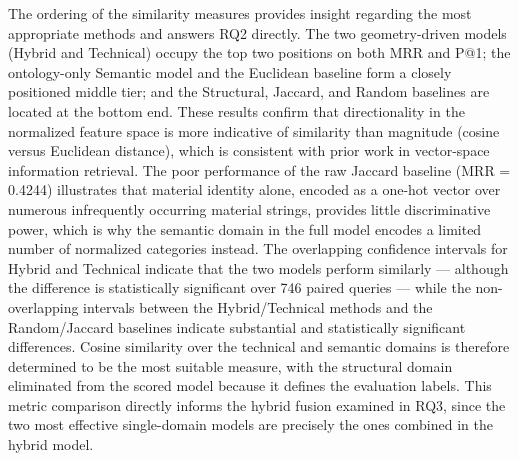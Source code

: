 \documentclass[preprint,12pt]{elsarticle}
\begin{document}
The ordering of the similarity measures provides insight regarding the most appropriate methods and answers RQ2 directly.
The two geometry-driven models (Hybrid and Technical) occupy the top two positions on both MRR and P@1; the ontology-only Semantic model and the Euclidean baseline form a closely positioned middle tier; and the Structural, Jaccard, and Random baselines are located at the bottom end.
These results confirm that directionality in the normalized feature space is more indicative of similarity than magnitude (cosine versus Euclidean distance), which is consistent with prior work in vector-space information retrieval.
The poor performance of the raw Jaccard baseline (MRR = 0.4244) illustrates that material identity alone, encoded as a one-hot vector over numerous infrequently occurring material strings, provides little discriminative power, which is why the semantic domain in the full model encodes a limited number of normalized categories instead.
The overlapping confidence intervals for Hybrid and Technical indicate that the two models perform similarly --- although the difference is statistically significant over 746 paired queries --- while the non-overlapping intervals between the Hybrid/Technical methods and the Random/Jaccard baselines indicate substantial and statistically significant differences.
Cosine similarity over the technical and semantic domains is therefore determined to be the most suitable measure, with the structural domain eliminated from the scored model because it defines the evaluation labels.
This metric comparison directly informs the hybrid fusion examined in RQ3, since the two most effective single-domain models are precisely the ones combined in the hybrid model.
\end{document}
